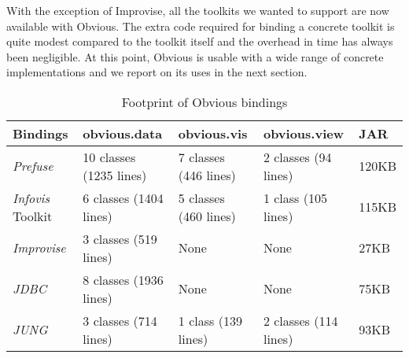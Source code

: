 With the exception of Improvise, all the toolkits we wanted to support
are now available with Obvious.  The extra code required for binding a
concrete toolkit is quite modest compared to the toolkit itself and
the overhead in time has always been negligible.  At this point,
Obvious is usable with a wide range of concrete implementations and we
report on its uses in the next section.

\begin{table}[h]
\caption{\label{tab:obviousfootprint} Footprint of Obvious bindings}
\small
\begin{tabular}{|p{\tableCol}|p{\tableCol}|p{\tableCol}|p{\tableCol}|p{\tableCol}|}
    \hline
    \textbf{Bindings} & \textbf{obvious.data} & \textbf{obvious.vis} & \textbf{obvious.view} & \textbf{JAR} \\
    \hline
    \textit{Prefuse} & 10 classes \newline(1235 lines) & 7 classes \newline(446 lines) & 2 classes \newline(94 lines) & 120KB \\
    \hline
    \textit{Infovis} Toolkit & 6 classes \newline(1404 lines) & 5 classes \newline(460 lines) & 1 class \newline(105 lines) & 115KB \\
    \hline
    \textit{Improvise} & 3 classes \newline(519 lines) & None & None & 27KB \\
    \hline
    \textit{JDBC} & 8 classes \newline(1936 lines) & None & None & 75KB \\
    \hline
    \textit{JUNG} & 3 classes \newline(714 lines) & 1 class \newline(139 lines) & 2 classes \newline(114 lines) & 93KB \\
    \hline
\end{tabular}
\normalsize
\end{table}
